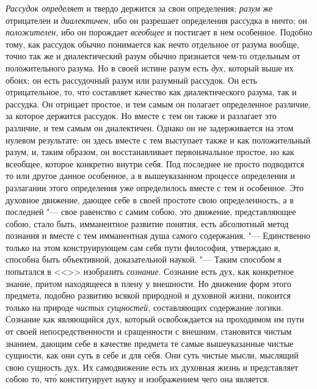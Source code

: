 {\em Рассудок определяет} и твердо держится за свои определения; {\em разум} же
отрицателен и {\em диалектичен,} ибо он разрешает определения рассудка в ничто;
он {\em положителен,} ибо он порождает {\em всеобщее} и постигает в нем
особенное. Подобно тому, как рассудок обычно понимается как нечто отдельное от
разума вообще, точно так же и диалектический разум обычно признается чем-то
отдельным от положительного разума. Но в своей истине разум есть {\em дух,}
который выше их обоих; он есть рассудочный разум или разумный рассудок. Он есть
отрицательное, то, чт\'{о} составляет качество как диалектического разума, так
и рассудка. Он отрицает простое, и тем самым он полагает определенное различие,
за которое держится рассудок. Но вместе с тем он также и разлагает это
различие, и тем самым он диалектичен. Однако он не задерживается на этом
нулевом результате: он здесь вместе с тем выступает также и как положительный
разум, и, таким образом, он восстанавливает первоначальное простое, но как
всеобщее, которое конкретно внутри себя. Под последнее не просто подводится то
или другое данное особенное, а в вышеуказанном процессе определения и
разлагании этого определения уже определилось вместе с тем и особенное. Это
духовное движение, дающее себе в своей простоте свою определенность, а в
последней "--- свое равенство с самим собою, это движение, представляющее
собою, стало быть, имманентное развитие понятия, есть абсолютный метод познания
и вместе с тем имманентная душа самого содержания. "--- Единственно только на
этом конструирующем сам себя пути философия, утверждаю я, способна быть
объективной, доказательной наукой. "--- Таким способом я попытался в
<<>> изобразить {\em сознание}. Сознание есть дух, как
конкретное знание, притом находящееся в плену у внешности. Но движение форм
этого предмета, подобно развитию всякой природной и духовной жизни, покоится
только на природе {\em чистых сущностей,} составляющих содержание логики.
Сознание как являющийся дух, который освобождается на проходимом им пути от
своей непосредственности и сращенности с внешним, становится чистым знанием,
дающим себе в качестве предмета те самые вышеуказанные чистые сущности, как они
суть в себе и для себя. Они суть чистые мысли, мыслящий свою сущность дух. Их
самодвижение есть их духовная жизнь и представляет собою то, чт\'{о}
конституирует науку и изображением чего она является.


